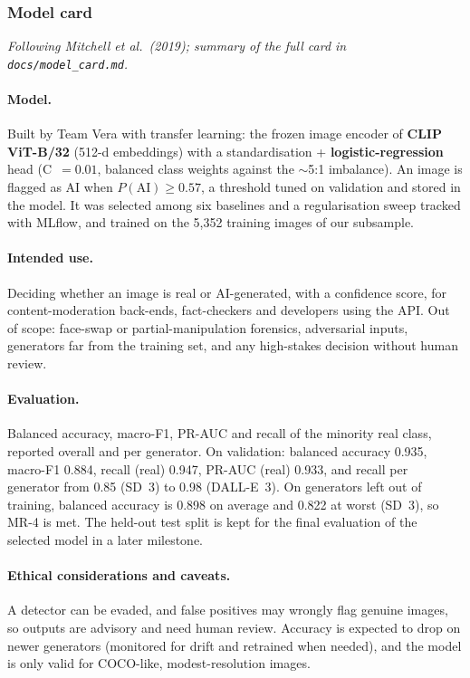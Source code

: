 \documentclass[11pt]{article}
\begin{document}
\subsubsection{Model card}
\textit{Following Mitchell et al.\ (2019); summary of the full card in \texttt{docs/model\_card.md}.}

\paragraph{Model.} Built by Team Vera with transfer learning: the frozen image encoder of \textbf{CLIP ViT-B/32} (512-d embeddings) with a standardisation + \textbf{logistic-regression} head (C~$=0.01$, balanced class weights against the $\sim$5:1 imbalance). An image is flagged as AI when $P(\text{AI}) \geq 0.57$, a threshold tuned on validation and stored in the model. It was selected among six baselines and a regularisation sweep tracked with MLflow, and trained on the 5{,}352 training images of our subsample.

\paragraph{Intended use.} Deciding whether an image is real or AI-generated, with a confidence score, for content-moderation back-ends, fact-checkers and developers using the API. Out of scope: face-swap or partial-manipulation forensics, adversarial inputs, generators far from the training set, and any high-stakes decision without human review.

\paragraph{Evaluation.} Balanced accuracy, macro-F1, PR-AUC and recall of the minority real class, reported overall and per generator. On validation: balanced accuracy 0.935, macro-F1 0.884, recall (real) 0.947, PR-AUC (real) 0.933, and recall per generator from 0.85 (SD~3) to 0.98 (DALL-E~3). On generators left out of training, balanced accuracy is 0.898 on average and 0.822 at worst (SD~3), so MR-4 is met. The held-out test split is kept for the final evaluation of the selected model in a later milestone.

\paragraph{Ethical considerations and caveats.} A detector can be evaded, and false positives may wrongly flag genuine images, so outputs are advisory and need human review. Accuracy is expected to drop on newer generators (monitored for drift and retrained when needed), and the model is only valid for COCO-like, modest-resolution images.
\end{document}
